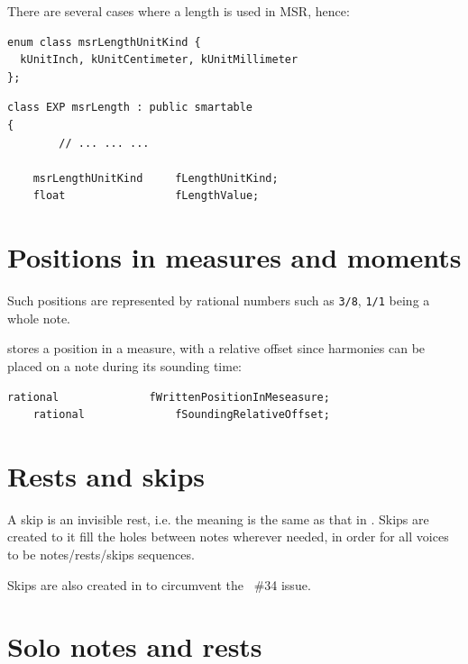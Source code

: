 There are several cases where a length is used in MSR, hence:
\begin{lstlisting}[language=CPlusPlus]
enum class msrLengthUnitKind {
  kUnitInch, kUnitCentimeter, kUnitMillimeter
};
\end{lstlisting}

\begin{lstlisting}[language=CPlusPlus]
class EXP msrLength : public smartable
{
		// ... ... ...

    msrLengthUnitKind     fLengthUnitKind;
    float                 fLengthValue;
\end{lstlisting}


\section{Positions in measures and moments}\label{Positions in measures and moments}

Such positions are represented by rational numbers such as {\tt 3/8}, {\tt 1/1} being a whole note.

 stores a position in a measure, with a relative offset since harmonies can be placed on a note during its sounding time:
\begin{lstlisting}[language=CPlusPlus]
    rational              fWrittenPositionInMeseasure;
    rational              fSoundingRelativeOffset;
\end{lstlisting}


\section{Rests and skips}\label{Rests and skips}

A skip is an invisible rest, i.e. the meaning is the same as that in \lily. Skips are created to {it fill the holes} between notes wherever needed, in order for all voices to be notes/rests/skips sequences.

Skips are also created in \msrToLpsr{} to circumvent the \lily\ \#34 issue.


\section{Solo notes and rests}\label{Solo notes and rests}

